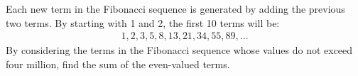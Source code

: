 
\begin{ProjectEuler}{1}
  Each new term in the Fibonacci sequence is generated by adding the previous
  two terms. By starting with 1 and 2, the first 10 terms will be:
  \begin{align*}
    1, 2, 3, 5, 8, 13, 21, 34, 55, 89, ...
  \end{align*}
  By considering the terms in the Fibonacci sequence whose values do not exceed
  four million, find the sum of the even-valued terms.
\end{ProjectEuler}



